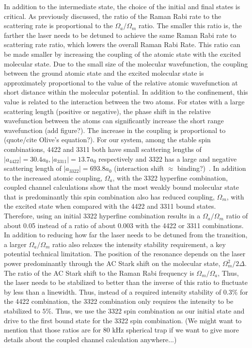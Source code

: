 \documentclass[aps,prl,twocolumn,groupedaddress]{revtex4-1}
\newcommand{\abs}[1]{{\left|{#1}\right|}}
\begin{document}
In addition to the intermediate state, the choice of the initial and final states is critical. As previously discussed, the ratio of the Raman Rabi rate to the scattering rate is proportional to the $ \Omega_a/\Omega_m $ ratio. The smaller this ratio is, the farther the laser needs to be detuned to achieve the same Raman Rabi rate to scattering rate ratio, which lowers the overall Raman Rabi Rate. This ratio can be made smaller by increasing the coupling of the atomic state with the excited molecular state. Due to the small size of the molecular wavefunction, the coupling between the ground atomic state and the excited molecular state is approximately proportional to the value of the relative atomic wavefunction at short distance within the molecular potential. In addition to the confinement, this value is related to the interaction between the two atoms. For states with a large scattering length (positive or negative), the phase shift in the relative wavefunction between the atoms can significantly increase the short range wavefunction (add figure?). The increase in the coupling is proportional to (quote/cite Olive's equation?). For our system, among the stable spin combinations, 4422 and 3311 both have small scattering lengths of $\abs{a_{4422}}= 30.4a_0, \abs{a_{3311}} = 13.7a_0 $ respectively and 3322 has a large and negative scattering length of $ \abs{a_{3322}} = 693.8a_0 $ (interaction shift $\approx$ binding?)~\cite{Hood2019}. In addition to the increased atomic coupling, $ \Omega_a $, with the 3322 hyperfine combination, coupled channel calculations show that the most weakly bound molecular state that is predominantly this spin combination also has reduced coupling, $ \Omega_m $, with the excited state when compared with the 4422 and 3311 bound states. Therefore, using an initial 3322 hyperfine combination results in a $ \Omega_a/\Omega_m$ ratio of about 0.05 instead of a ratio of about 0.003 with the 4422 or 3311 combinations. In addition to reducing how far the laser needs to be detuned from the transition, a larger $ \Omega_a/\Omega_m$ ratio also relaxes the intensity stability requirement, a key potential technical limitation. The position of the resonance depends on the laser power predominantly through the AC Stark shift on the molecular state, $ \Omega_m^2 / 2\Delta $. The ratio of the AC Stark shift to the Raman Rabi frequency is $ \Omega_m / \Omega_a $, Thus, the laser needs to be stabilized to better than the inverse of this ratio to fluctuate by less than a linewidth. Thus, instead of a required intensity stability of $0.3 \% $ for the 4422 combination, the 3322 combination only requires the intensity to be stabilized to $ 5\% $.  Thus, we use the 3322 spin combination as our initial state and drive to the first bound state for the 3322 spin combination. (We might want to mention that those ratios are for 80 kHz spherical trap if we want to give more details about the coupled channel calculation anywhere...)
\end{document}
